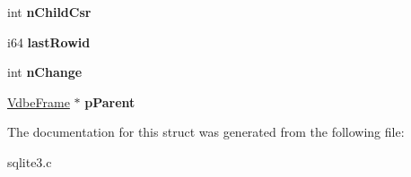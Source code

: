 \begin{DoxyCompactItemize}
\item 
\hypertarget{struct_vdbe_frame_a2d2900348092258d12eb71057812429a}{int {\bfseries n\-Child\-Csr}}\label{struct_vdbe_frame_a2d2900348092258d12eb71057812429a}

\item 
\hypertarget{struct_vdbe_frame_af655193217fb53c7acab9d24c94344aa}{i64 {\bfseries last\-Rowid}}\label{struct_vdbe_frame_af655193217fb53c7acab9d24c94344aa}

\item 
\hypertarget{struct_vdbe_frame_a77aacb67d627f4446dd50a795b5a2f0f}{int {\bfseries n\-Change}}\label{struct_vdbe_frame_a77aacb67d627f4446dd50a795b5a2f0f}

\item 
\hypertarget{struct_vdbe_frame_afb11d8aa920f34720333f52737375d59}{\hyperlink{struct_vdbe_frame}{Vdbe\-Frame} $\ast$ {\bfseries p\-Parent}}\label{struct_vdbe_frame_afb11d8aa920f34720333f52737375d59}

\end{DoxyCompactItemize}


The documentation for this struct was generated from the following file\-:\begin{DoxyCompactItemize}
\item 
sqlite3.\-c\end{DoxyCompactItemize}
